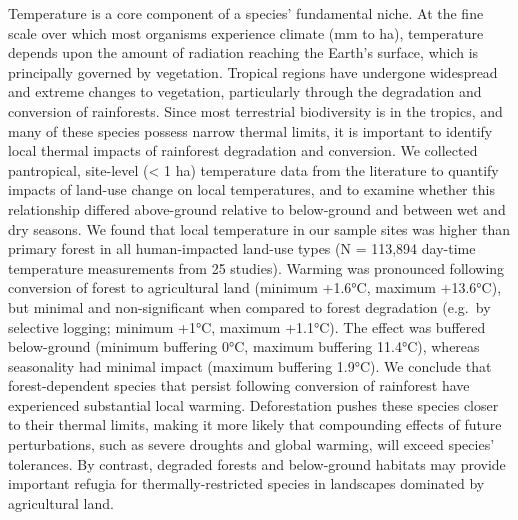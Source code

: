\documentclass[12pt,a4paper,]{report}
\theoremstyle{definition}
\theoremstyle{definition}
\theoremstyle{definition}
\theoremstyle{remark}
\begin{document}
Temperature is a core component of a species' fundamental niche. At the
fine scale over which most organisms experience climate (mm to ha),
temperature depends upon the amount of radiation reaching the Earth's
surface, which is principally governed by vegetation. Tropical regions
have undergone widespread and extreme changes to vegetation,
particularly through the degradation and conversion of rainforests.
Since most terrestrial biodiversity is in the tropics, and many of these
species possess narrow thermal limits, it is important to identify local
thermal impacts of rainforest degradation and conversion. We collected
pantropical, site-level (\textless{} 1 ha) temperature data from the
literature to quantify impacts of land-use change on local temperatures,
and to examine whether this relationship differed above-ground relative
to below-ground and between wet and dry seasons. We found that local
temperature in our sample sites was higher than primary forest in all
human-impacted land-use types (N = 113,894 day-time temperature
measurements from 25 studies). Warming was pronounced following
conversion of forest to agricultural land (minimum +1.6°C, maximum
+13.6°C), but minimal and non-significant when compared to forest
degradation (e.g.~by selective logging; minimum +1°C, maximum +1.1°C).
The effect was buffered below-ground (minimum buffering 0°C, maximum
buffering 11.4°C), whereas seasonality had minimal impact (maximum
buffering 1.9°C). We conclude that forest-dependent species that persist
following conversion of rainforest have experienced substantial local
warming. Deforestation pushes these species closer to their thermal
limits, making it more likely that compounding effects of future
perturbations, such as severe droughts and global warming, will exceed
species' tolerances. By contrast, degraded forests and below-ground
habitats may provide important refugia for thermally-restricted species
in landscapes dominated by agricultural land.


\end{document}
